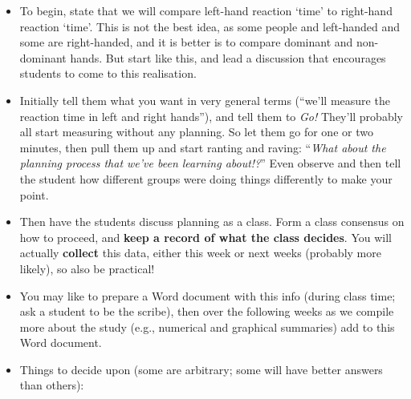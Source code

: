 \documentclass[
  11pt,
  a4paper,
  krantz2]{krantz}
\providecommand{\tightlist}{%
  \setlength{\itemsep}{0pt}\setlength{\parskip}{0pt}}
\begin{document}
\begin{itemize}
\tightlist
\item
  To begin, state that we will compare left-hand reaction `time' to right-hand reaction `time'.
  This is not the best idea, as some people and left-handed and some are right-handed, and it is better is to compare dominant and non-dominant hands.
  But start like this, and lead a discussion that encourages students to come to this realisation.
\item
  Initially tell them what you want in very general terms (``we'll measure the reaction time in left and right hands''), and tell them to \emph{Go!}
  They'll probably all start measuring without any planning.
  So let them go for one or two minutes, then pull them up and start ranting and raving: ``\emph{What about the planning process that we've been learning about!?}''
  Even observe and then tell the student how different groups were doing things differently to make your point.
\item
  Then have the students discuss planning as a class.
  Form a class consensus on how to proceed, and \textbf{keep a record of what the class decides}.
  You will actually \textbf{collect} this data, either this week or next weeks (probably more likely), so also be practical!
\item
  You may like to prepare a Word document with this info (during class time; ask a student to be the scribe), then over the following weeks as we compile more about the study (e.g., numerical and graphical summaries) add to this Word document.
\item
  Things to decide upon (some are arbitrary; some will have better answers than others):


\end{itemize}
\end{document}

